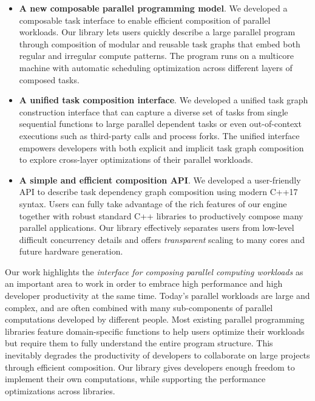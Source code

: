 \documentclass[conference]{IEEEtran}
\begin{document}
\begin{itemize}[leftmargin=*]

\item \textbf{A new composable parallel programming model}. 
We developed a composable task interface
to enable efficient composition of parallel workloads.
Our library lets users quickly describe a large parallel program 
through composition of modular and reusable task graphs that 
embed both regular and irregular compute patterns.
The program runs on a multicore machine with automatic scheduling optimization 
across different layers of composed tasks.


\item \textbf{A unified task composition interface}.
We developed a unified task graph construction interface that can capture a diverse set of tasks
from single sequential functions to large parallel dependent tasks or 
even out-of-context executions such as third-party calls and process forks.
The unified interface empowers developers with both explicit and implicit 
task graph composition to explore cross-layer optimizations
of their parallel workloads.

\item \textbf{A simple and efficient composition API}.
We developed a user-friendly API to describe task dependency graph composition using modern C++17 syntax.
Users can fully take advantage of the rich features of our engine
together with robust standard C++ libraries to productively compose many parallel applications.
Our library effectively separates users from 
low-level difficult concurrency details and offers \textit{transparent} scaling 
to many cores and future hardware generation.

\end{itemize}

Our work highlights the \textit{interface for composing parallel computing workloads}
as an important area to work in order to 
embrace high performance and high developer productivity at the same time.
Today's parallel workloads are large and complex, 
and are often combined with many sub-components of parallel computations
developed by different people.
Most existing parallel programming libraries feature domain-specific functions
to help users optimize their workloads but require them to fully 
understand the entire program structure.
This inevitably degrades the productivity of developers 
to collaborate on large projects through efficient composition.
Our library gives developers enough freedom to implement their own computations,
while supporting the performance optimizations across libraries.
\end{document}
